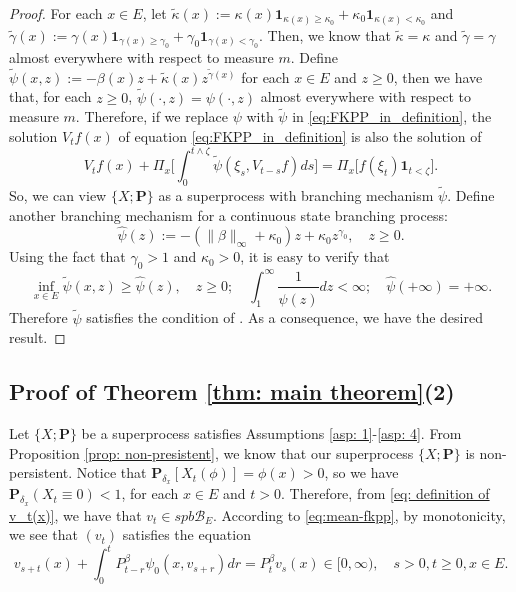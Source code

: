 \documentclass[12pt, a4paper]{amsart}
\theoremstyle{definition}
\numberwithin{equation}{section}
\begin{document}
\begin{proof}
	For each $x\in E$, let $\tilde \kappa(x) := \kappa(x) \mathbf 1_{\kappa(x)\geq \kappa_0} + \kappa_0 \mathbf 1_{\kappa(x) < \kappa_0}$ and $\tilde \gamma(x) := \gamma(x) \mathbf 1_{\gamma(x)\geq \gamma_0} + \gamma_0 \mathbf 1_{\gamma(x) < \gamma_0}$.
	Then, we know that $\tilde \kappa = \kappa$ and $\tilde \gamma = \gamma$ almost everywhere with respect to measure $m$.
	Define $\widetilde \psi(x,z) := - \beta(x)z+ \tilde \kappa(x)z^{\tilde \gamma(x)}$ for each $x\in E$ and $z\geq 0$, then we have that, for each $z\geq 0$, $\widetilde \psi(\cdot, z) = \psi(\cdot , z) $ almost everywhere with respect to measure $m$.
	Therefore, if we replace $\psi$ with $\tilde\psi$ in \eqref{eq:FKPP_in_definition}, the solution $V_tf(x)$ of equation \eqref{eq:FKPP_in_definition} is also the solution of
\[
	V_t f(x) + \Pi_x \Big[  \int_0^{t\wedge \zeta} \widetilde \psi (\xi_s,V_{t-s} f) ds \Big]
	=\Pi_x \big[ f(\xi_t)\mathbf 1_{t<\zeta} \big].
\]
	So, we can view $\{X; \mathbf P\}$ as a superprocess with branching mechanism $\tilde \psi$.
	Define another branching mechanism for a continuous state branching process:
\[
	\widehat\psi(z)
	:= - (\|\beta\|_\infty +\kappa_0 )z + \kappa_0 z^{\gamma_0},
	\quad z\geq 0.
\]
	Using the fact that $\gamma_0 > 1$ and $\kappa_0 > 0$, it is easy to verify that
\[
	\inf_{x\in E}\widetilde \psi(x,z)
	\geq \hat\psi(z),
	\quad z\geq 0;
	\quad \int_1^\infty \frac{1}{\widehat\psi(z)} dz
	< \infty;
	\quad \hat \psi(+\infty) = +\infty.
\]
	Therefore $\widetilde \psi$ satisfies the condition of \cite[Lemma 2.3]{RenSongZhang2015Limit}.
	As a consequence,
	we have the desired result.
\end{proof}

\subsection{Proof of Theorem \ref{thm: main theorem}(2)}
\label{sec: proof of result 2}
	Let $\{X; \mathbf P\}$ be a superprocess satisfies 
	Assumptions \ref{asp: 1}-\ref{asp: 4}.
	From Proposition \ref{prop: non-presistent}, we know that our superprocess $\{X;\mathbf P\}$ is non-persistent.
	Notice that $\mathbf P_{\delta_x}[X_t(\phi)] = \phi(x)>0$, so we have $\mathbf P_{\delta_x}(X_t \equiv 0)<1$, for each $x\in E$ and $t>0$.
	Therefore, from \eqref{eq: definition of v_t(x)}, we have that $v_t \in spb\mathscr B_E$.
	According to \eqref{eq:mean-fkpp}, by monotonicity, we see that $(v_t)$ satisfies the equation
\[
	v_{s+t}(x) + \int_0^t P^\beta_{t-r} \psi_0(x,v_{s+r}) dr
	= P^\beta_t v_s(x)
	\in [0,\infty),
	\quad s>0, t \geq 0,x \in E.
\]
\end{document}
